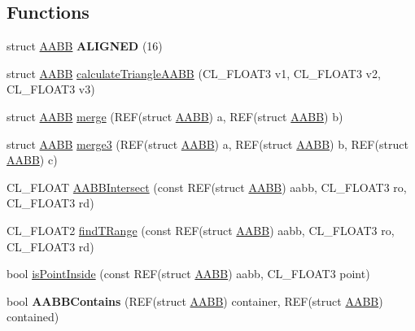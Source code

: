 \subsection*{Functions}
\begin{DoxyCompactItemize}
\item 
struct \hyperlink{struct_a_a_b_b}{A\+A\+BB} {\bfseries A\+L\+I\+G\+N\+ED} (16)\hypertarget{group__g11_gab802f98c49419f0ca1fdb8e8f13bafcc}{}\label{group__g11_gab802f98c49419f0ca1fdb8e8f13bafcc}

\item 
struct \hyperlink{struct_a_a_b_b}{A\+A\+BB} \hyperlink{group__g11_ga8627c42e218efdd10747f8b512d25035}{calculate\+Triangle\+A\+A\+BB} (C\+L\+\_\+\+F\+L\+O\+A\+T3 v1, C\+L\+\_\+\+F\+L\+O\+A\+T3 v2, C\+L\+\_\+\+F\+L\+O\+A\+T3 v3)
\item 
struct \hyperlink{struct_a_a_b_b}{A\+A\+BB} \hyperlink{group__g11_gac2da14ffb4b72e1333d2dd4c473930c6}{merge} (R\+EF(struct \hyperlink{struct_a_a_b_b}{A\+A\+BB}) a, R\+EF(struct \hyperlink{struct_a_a_b_b}{A\+A\+BB}) b)
\item 
struct \hyperlink{struct_a_a_b_b}{A\+A\+BB} \hyperlink{group__g11_ga97d7d3e9ba937b926a2203da642439e5}{merge3} (R\+EF(struct \hyperlink{struct_a_a_b_b}{A\+A\+BB}) a, R\+EF(struct \hyperlink{struct_a_a_b_b}{A\+A\+BB}) b, R\+EF(struct \hyperlink{struct_a_a_b_b}{A\+A\+BB}) c)
\item 
C\+L\+\_\+\+F\+L\+O\+AT \hyperlink{group__g11_ga0250138cf6d4bb5c915ef6b5abed12ef}{A\+A\+B\+B\+Intersect} (const R\+EF(struct \hyperlink{struct_a_a_b_b}{A\+A\+BB}) aabb, C\+L\+\_\+\+F\+L\+O\+A\+T3 ro, C\+L\+\_\+\+F\+L\+O\+A\+T3 rd)
\item 
C\+L\+\_\+\+F\+L\+O\+A\+T2 \hyperlink{group__g11_ga85d0265d7b57d02084d8992c88c061ee}{find\+T\+Range} (const R\+EF(struct \hyperlink{struct_a_a_b_b}{A\+A\+BB}) aabb, C\+L\+\_\+\+F\+L\+O\+A\+T3 ro, C\+L\+\_\+\+F\+L\+O\+A\+T3 rd)
\item 
bool \hyperlink{group__g11_ga5a4fb2271cfab333894518a428bff56f}{is\+Point\+Inside} (const R\+EF(struct \hyperlink{struct_a_a_b_b}{A\+A\+BB}) aabb, C\+L\+\_\+\+F\+L\+O\+A\+T3 point)
\item 
bool {\bfseries A\+A\+B\+B\+Contains} (R\+EF(struct \hyperlink{struct_a_a_b_b}{A\+A\+BB}) container, R\+EF(struct \hyperlink{struct_a_a_b_b}{A\+A\+BB}) contained)\hypertarget{group__g11_ga2240fe2be1f384a7367a99257cf44599}{}\label{group__g11_ga2240fe2be1f384a7367a99257cf44599}


\end{DoxyCompactItemize}
